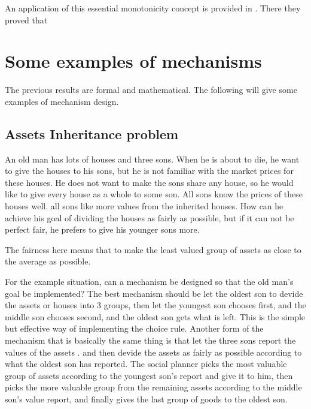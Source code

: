 An application of this essential monotonicity concept is provided
in \parencite{SonmezJet1996}.  There they proved that 
\section{Some examples of  mechanisms}

The previous results are formal and  mathematical. The following will give some examples of mechanism design.

\subsection{Assets Inheritance problem}
\begin{example}
An old man has lots of  houses and three sons. When he is about to die, he
want to give the houses to his sons, but he is not familiar with the
market prices for these houses. He does not want to make the sons
share any house, so he would like to  give every  house as a whole to some son. All  sons know the prices of these
houses well. all  sons like more values from the
inherited houses. How can he achieve his goal of dividing the houses as
fairly as possible, but if it can not be perfect fair, he prefers to
give his younger sons more. 

The fairness here means that to make the least valued group of assets as close to the average as possible.

\end{example} 

For the example situation, can a mechanism be designed so that the old
man's goal be implemented? The best mechanism should be let the oldest son to devide the assets or houses into 3 groups, then let the youngest son chooses first, and the middle son chooses second, and the oldest
son gets what is left. This is the simple but effective way of implementing the choice rule. Another form of the mechanism that is basically the same thing is that let the three sons report the values of the assets
. and then devide the assets as fairly as possible according to what the oldest son has reported. The social planner picks the most valuable group of assets according to the youngest son's report and 
give it to him, 
then picks the more valuable group from the remaining assets according to the middle son's value report, and finally gives the last group of goods to  the oldest son.

